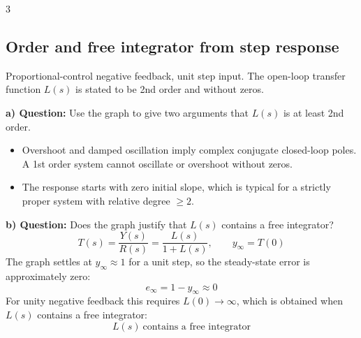 \documentclass[9pt, landscape, a4paper]{article}
\begin{document}
\begin{multicols*}{3}
\subsection{Order and free integrator from step response}
Proportional-control negative feedback, unit step input. The open-loop transfer
function $L(s)$ is stated to be 2nd order and without zeros.
\begin{center}
\end{center}
\textbf{a) Question:} Use the graph to give two arguments that $L(s)$ is at
least 2nd order.
\begin{itemize}
    \item Overshoot and damped oscillation imply complex conjugate closed-loop poles.
    A 1st order system cannot oscillate or overshoot without zeros.
    \item The response starts with zero initial slope, which is typical for a
    strictly proper system with relative degree $\ge 2$.
\end{itemize}
\textbf{b) Question:} Does the graph justify that $L(s)$ contains a free
integrator?
\[
    T(s)=\frac{Y(s)}{R(s)}=\frac{L(s)}{1+L(s)},\qquad
    y_\infty=T(0)
\]
The graph settles at $y_\infty\approx 1$ for a unit step, so the steady-state
error is approximately zero:
\[
    e_\infty=1-y_\infty\approx 0
\]
For unity negative feedback this requires $L(0)\to\infty$, which is obtained
when $L(s)$ contains a free integrator:
\[
    \boxed{L(s)\ \text{contains a free integrator}}
\]


\end{multicols*}
\end{document}
